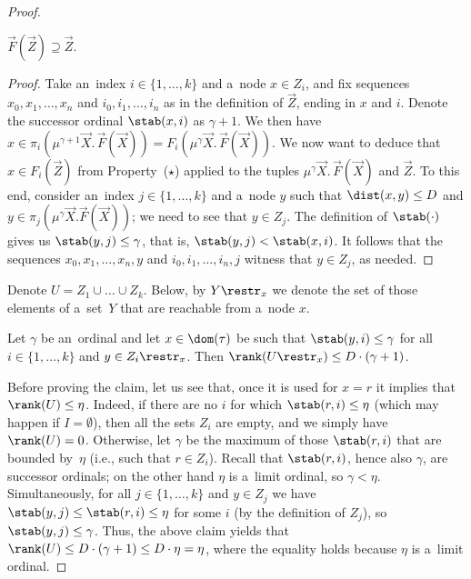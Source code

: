 \begin{proof}
	\begin{clm}
		$\vec{F}(\vec{Z})\supseteq\vec{Z}$.
	\end{clm}

	\begin{proof}
		Take an~index $i\in\{1,\dots,k\}$ and a~node $x\in Z_i$, and fix sequences $x_0,x_1,\dots,x_n$ and $i_0,i_1,\dots,i_n$ as in the definition of $\vec{Z}$, ending in $x$ and $i$.
		Denote the successor ordinal $\stab(x,i)$ as $\gamma+1$.
		We then have $x\in\pi_i(\mu^{\gamma+1}\vec{X}.\,\vec{F}(\vec{X}))=F_i(\mu^\gamma\vec{X}.\,\vec{F}(\vec{X}))$.
		We now want to deduce that $x\in F_i(\vec{Z})$ from Property~($\star$) applied to the tuples $\mu^\gamma\vec{X}.\,\vec{F}(\vec{X})$ and $\vec{Z}$.
		To this end, consider an~index $j\in\{1,\dots,k\}$ and a~node $y$ such that $\dist(x,y)\leq D$ and $y\in\pi_j(\mu^\gamma\vec{X}.\vec{F}(\vec{X}))$;
		we need to see that $y\in Z_j$.
		The definition of $\stab(\cdot)$ gives us $\stab(y,j)\leq\gamma$, that is, $\stab(y,j)<\stab(x,i)$.
		It follows that the sequences $x_0,x_1,\dots,x_n,y$ and $i_0,i_1,\dots,i_n,j$ witness that $y\in Z_j$, as needed.
	\end{proof}
	
	Denote $U=Z_1\cup\dots\cup Z_k$.
	Below, by $Y\restr_x$ we denote the set of those elements of a~set~$Y$ that are reachable from a~node $x$.
	
	\begin{clm}\label{clm:2}
		Let $\gamma$ be an~ordinal and let $x\in\dom(\tau)$ be such that $\stab(y,i)\leq\gamma$ for all $i\in\{1,\dots,k\}$ and $y\in Z_i\restr_x$.
		Then $\rank(U\restr_x)\leq D\cdot(\gamma+1)$.
	\end{clm}
		
	Before proving the claim, let us see that, once it is used for $x=r$ it implies that $\rank(U)\leq\eta$.
	Indeed, if there are no $i$ for which $\stab(r,i)\leq\eta$ (which may happen if $I=\emptyset$), then all the sets $Z_i$ are empty, and we simply have $\rank(U)=0$.
	Otherwise, let $\gamma$ be the maximum of those $\stab(r,i)$ that are bounded by~$\eta$ (i.e., such that $r\in Z_i$).
	Recall that $\stab(r,i)$, hence also $\gamma$, are successor ordinals; on the other hand $\eta$ is a~limit ordinal, so $\gamma<\eta$.
	Simultaneously, for all $j\in\{1,\dots,k\}$ and $y\in Z_j$ we have $\stab(y,j)\leq\stab(r,i)\leq\eta$ for some $i$ (by the definition of $Z_j$), so $\stab(y,j)\leq\gamma$.
	Thus, the above claim yields that $\rank(U)\leq D\cdot(\gamma+1)\leq D\cdot\eta=\eta$, where the equality holds because $\eta$ is a~limit ordinal.
	

\end{proof}
